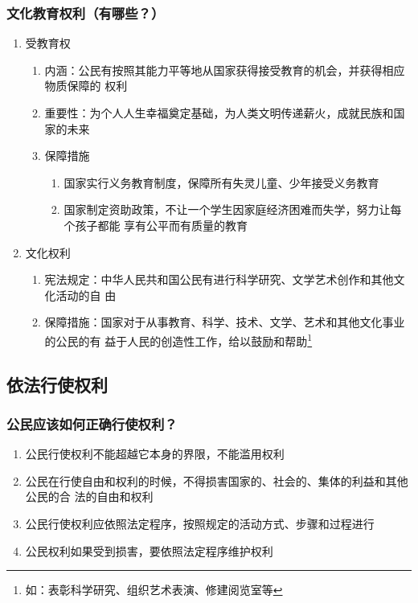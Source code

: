 \documentclass[11pt]{article}
\begin{document}
\subsubsection{文化教育权利（有哪些？）}
\label{sec:org1c664fc}
\begin{enumerate}
\item 受教育权
\begin{enumerate}
\item 内涵：公民有按照其能力平等地从国家获得接受教育的机会，并获得相应物质保障的
权利
\item 重要性：为个人人生幸福奠定基础，为人类文明传递薪火，成就民族和国家的未来
\item 保障措施
\begin{enumerate}
\item 国家实行义务教育制度，保障所有失灵儿童、少年接受义务教育
\item 国家制定资助政策，不让一个学生因家庭经济困难而失学，努力让每个孩子都能
享有公平而有质量的教育
\end{enumerate}
\end{enumerate}
\item 文化权利
\begin{enumerate}
\item 宪法规定：中华人民共和国公民有进行科学研究、文学艺术创作和其他文化活动的自
由
\item 保障措施：国家对于从事教育、科学、技术、文学、艺术和其他文化事业的公民的有
益于人民的创造性工作，给以鼓励和帮助\footnote{如：表彰科学研究、组织艺术表演、修建阅览室等}
\end{enumerate}
\end{enumerate}
\subsection{依法行使权利}
\label{sec:org263864f}
\subsubsection{公民应该如何正确行使权利？}
\label{sec:org651fa0f}
\begin{enumerate}
\item 公民行使权利不能超越它本身的界限，不能滥用权利
\item 公民在行使自由和权利的时候，不得损害国家的、社会的、集体的利益和其他公民的合
法的自由和权利
\item 公民行使权利应依照法定程序，按照规定的活动方式、步骤和过程进行
\item 公民权利如果受到损害，要依照法定程序维护权利
\end{enumerate}
\end{document}
